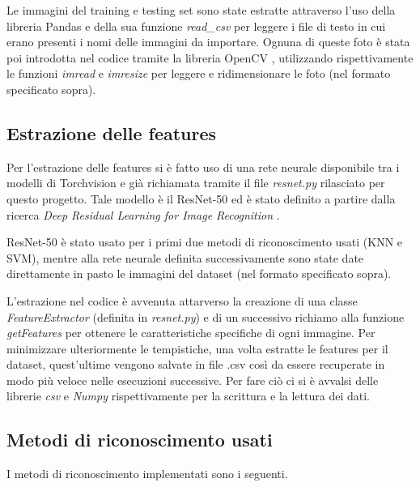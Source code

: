 \documentclass[11pt, a4paper, titlepage]{article}
\begin{document}
\medskip
Le immagini del training e testing set sono state estratte attraverso l'uso della libreria Pandas \cite{pandas} e della sua funzione \emph{read\_csv} per leggere i file di testo in cui erano presenti i nomi delle immagini da importare. Ognuna di queste foto è stata poi introdotta nel codice tramite la libreria OpenCV \cite{opencv}, utilizzando rispettivamente le funzioni \emph{imread} e \emph{imresize} per leggere e ridimensionare le foto (nel formato specificato sopra).

\subsection{Estrazione delle features}
Per l'estrazione delle features si è fatto uso di una rete neurale disponibile tra i modelli di Torchvision \cite{pytorch} e già richiamata tramite il file \emph{resnet.py} rilasciato per questo progetto. Tale modello è il ResNet-50 ed è stato definito a partire dalla ricerca \emph{Deep Residual Learning for Image Recognition} \cite{resnet50}.

ResNet-50 è stato usato per i primi due metodi di riconoscimento usati (KNN e SVM), mentre alla rete neurale definita successivamente sono state date direttamente in pasto le immagini del dataset (nel formato specificato sopra).
 
\medskip
L'estrazione nel codice è avvenuta attarverso la creazione di una classe \emph{FeatureExtractor} (definita in \emph{resnet.py}) e di un successivo richiamo alla funzione \emph{getFeatures} per ottenere le caratteristiche specifiche di ogni immagine.  
Per minimizzare ulteriormente le tempistiche, una volta estratte le features per il dataset, quest'ultime vengono salvate in file .csv così da essere recuperate in modo più veloce nelle esecuzioni successive. Per fare ciò ci si è avvalsi delle librerie \emph{csv} e \emph{Numpy} \cite{numpy1}\cite{numpy2} rispettivamente per la scrittura e la lettura dei dati. 

\subsection{Metodi di riconoscimento usati}
I metodi di riconoscimento implementati sono i seguenti. 
\end{document}
